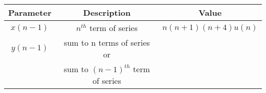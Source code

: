 \begin{tabular}{|c|c|c|}
\hline
\textbf{Parameter} & \textbf{Description} & \textbf{Value} \\
\hline
$x(n-1)$ & $n^{th}$ term of series & $n(n+1)(n+4)u(n)$\\
\hline
$y(n-1)$ & sum to n terms of series or & \\&sum to $(n-1)^{th}$ term of series&\\
\hline
\end{tabular}
